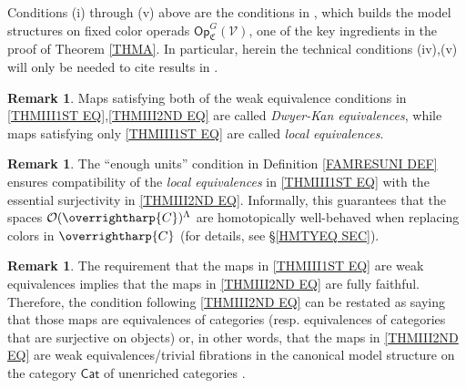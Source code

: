 \documentclass[a4paper,10pt
 ,final
]{article}%
\numberwithin{equation}{section}
\numberwithin{figure}{section}
\theoremstyle{definition} %
\newtheorem{remark}[equation]{Remark}%
\newcommand{\vect}[1]{\text{\overrightharp{\ensuremath{#1}}}}
\newcommand{\Op}{\mathsf{Op}}%
\newcommand{\V}{\ensuremath{\mathcal V}}
\renewcommand{\O}{\ensuremath{\mathcal O}}
\newcommand{\1}{\ensuremath{\mathbbm 1}}%
\begin{document}
Conditions (i) through (v) above  
are the conditions in \cite[Thm. \ref{OC-THMI}]{BP_FCOP},
which builds the model structures on
fixed color operads
$\Op^G_{\mathfrak{C}}(\V)$, 
one of the key ingredients in the proof
of Theorem \ref{THMA}.
In particular,
herein the technical conditions
(iv),(v) will only be needed to cite
results in \cite{BP_FCOP}.


\begin{remark}
Maps satisfying both of the weak equivalence conditions in 
\eqref{THMIII1ST EQ},\eqref{THMIII2ND EQ}
are called \emph{Dwyer-Kan equivalences},
while maps satisfying only \eqref{THMIII1ST EQ}
are called \emph{local equivalences}.
\end{remark}


\begin{remark}\label{WHYEU REM}
The ``enough units'' condition in Definition \ref{FAMRESUNI DEF}
ensures compatibility of the \emph{local equivalences}
in \eqref{THMIII1ST EQ}
with the essential surjectivity in	\eqref{THMIII2ND EQ}.
%
Informally, this guarantees that the spaces 
$\O(\vect{C})^{\Lambda}$
are homotopically well-behaved when replacing colors 
in $\vect{C}$
(for details, see \S \ref{HMTYEQ SEC}).
\end{remark}




\begin{remark}\label{WETRFCAN REM}
The requirement that the maps in 
\eqref{THMIII1ST EQ}
are weak equivalences implies that the maps in
\eqref{THMIII2ND EQ}
are fully faithful.
Therefore, the condition following \eqref{THMIII2ND EQ}
can be restated as saying that those maps are
equivalences of categories (resp. equivalences of categories that are surjective on objects) or, in other words,
that the maps in \eqref{THMIII2ND EQ}
are weak equivalences/trivial fibrations in the canonical model structure on the category $\mathsf{Cat}$ of unenriched categories
\cite{Rez}.
\end{remark}
\end{document}
